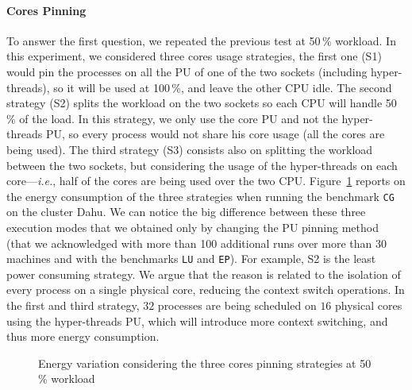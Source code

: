 \paragraph{Cores Pinning}
To answer the first question, we repeated the previous test at 50\,\% workload.
In this experiment, we considered three cores usage strategies, the first one (\textsf{S1}) would pin the processes on all the PU of one of the two sockets (including hyper-threads), so it will be used at 100\,\%, and leave the other CPU idle.
The second strategy (\textsf{S2}) splits the workload on the two sockets so each CPU will handle 50\,\% of the load.
In this strategy, we only use the core PU and not the hyper-threads PU, so every process would not share his core usage (all the cores are being used).
The third strategy (\textsf{S3}) consists also on splitting the workload between the two sockets, but considering the usage of the hyper-threads on each core---\emph{i.e.}, half of the cores are being used over the two CPU.
Figure~\ref{fig:cores-pinning} reports on the energy consumption of the three strategies when running the benchmark \texttt{CG} on the cluster \textsf{Dahu}.
We can notice the big difference between these three execution modes that we obtained only by changing the PU pinning method (that we acknowledged with more than 100 additional runs over more than 30 machines and with the benchmarks \texttt{LU} and \texttt{EP}).
For example, \textsf{S2} is the least power consuming strategy.
We argue that the reason is related to the isolation of every process on a single physical core, reducing the context switch operations.
In the first and third strategy, $32$ processes are being scheduled on $16$ physical cores using the hyper-threads PU, which will introduce more context switching, and thus more energy consumption.

\begin{figure}
    \caption{Energy variation considering the three cores pinning strategies at 50\,\% workload}\label{fig:cores-pinning}
\end{figure}

